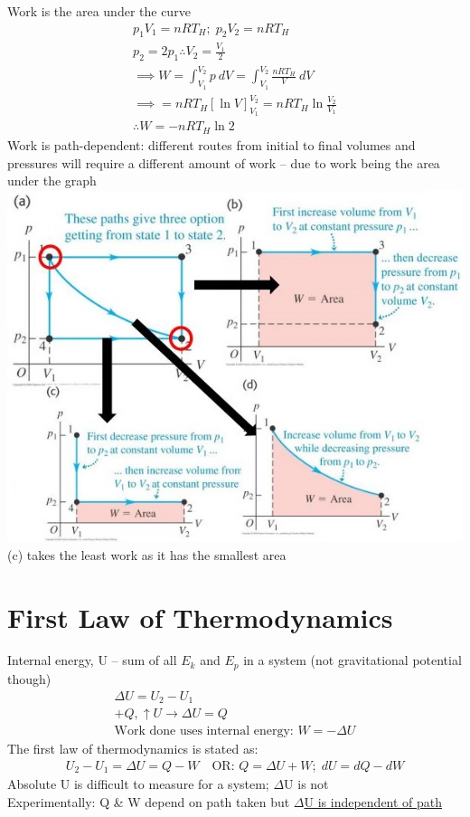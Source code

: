 \documentclass[a4paper, 11pt, normalem]{report}
\begin{document}
Work is the area under the curve
\begin{gather*}
	p_{1}V_{1} = nRT_{H}; \; p_{2}V_{2} = nRT_{H} \\
	p_{2} = 2p_{1} \therefore V_{2} = \frac{V_{1}}{2} \\
	\implies W = \int_{V_{1}}^{V_{2}} p\:dV = \int_{V_{1}}^{V_{2}} \frac{nRT_{H}}{V}\:dV \\
	\implies = nRT_{H}[\ln{V}]_{V_{1}}^{V_{2}} = nRT_{H}\ln{\frac{V_{2}}{V_{1}}} \\
	\therefore W = -nRT_{H}\ln{2}
\end{gather*}
Work is path-dependent: different routes from initial to final volumes and pressures will require a different amount of work -- due to work being the area under the graph \\
\includegraphics[scale=0.8]{Paths.jpg} \\
(c) takes the least work as it has the smallest area

\section{First Law of Thermodynamics}
Internal energy, U -- sum of all $E_{k}$ and $E_{p}$ in a system (not gravitational potential though)
\begin{gather*}
	{\Delta}U = U_{2} - U_{1} \\
	+ Q, \uparrow U \rightarrow {\Delta}U = Q \\
	\text{Work done uses internal energy: } W = -{\Delta}U
\end{gather*}
The first law of thermodynamics is stated as:
\begin{gather*}
	U_{2} - U_{1} = {\Delta}U = Q - W \quad \text{OR: } Q = {\Delta}U + W; \; dU = dQ - dW
\end{gather*}
Absolute U is difficult to measure for a system; $\Delta$U is not \\
Experimentally: Q \& W depend on path taken but \underline{$\Delta$U is independent of path}
\end{document}

